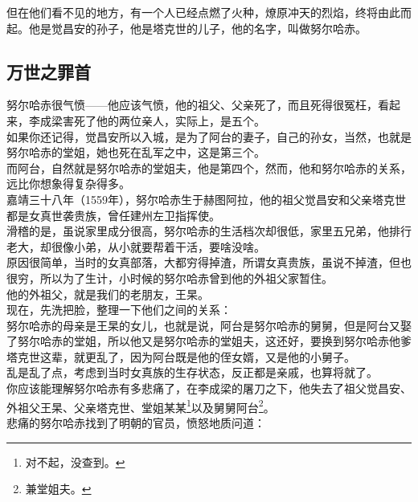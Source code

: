 \begin{multicols}{\theparacolNo}
但在他们看不见的地方，有一个人已经点燃了火种，燎原冲天的烈焰，终将由此而起。他是觉昌安的孙子，他是塔克世的儿子，他的名字，叫做努尔哈赤。\\

\subsection{万世之罪首}
努尔哈赤很气愤——他应该气愤，他的祖父、父亲死了，而且死得很冤枉，看起来，李成梁害死了他的两位亲人，实际上，是五个。\\

如果你还记得，觉昌安所以入城，是为了阿台的妻子，自己的孙女，当然，也就是努尔哈赤的堂姐，她也死在乱军之中，这是第三个。\\

而阿台，自然就是努尔哈赤的堂姐夫，他是第四个，然而，他和努尔哈赤的关系，远比你想象得复杂得多。\\

嘉靖三十八年（1559年），努尔哈赤生于赫图阿拉，他的祖父觉昌安和父亲塔克世都是女真世袭贵族，曾任建州左卫指挥使。\\

滑稽的是，虽说家里成分很高，努尔哈赤的生活档次却很低，家里五兄弟，他排行老大，却很像小弟，从小就要帮着干活，要啥没啥。\\

原因很简单，当时的女真部落，大都穷得掉渣，所谓女真贵族，虽说不掉渣，但也很穷，所以为了生计，小时候的努尔哈赤曾到他的外祖父家暂住。\\

他的外祖父，就是我们的老朋友，王杲。\\

现在，先洗把脸，整理一下他们之间的关系：\\

努尔哈赤的母亲是王杲的女儿，也就是说，阿台是努尔哈赤的舅舅，但是阿台又娶了努尔哈赤的堂姐，所以他又是努尔哈赤的堂姐夫，这还好，要换到努尔哈赤他爹塔克世这辈，就更乱了，因为阿台既是他的侄女婿，又是他的小舅子。\\

乱是乱了点，考虑到当时女真族的生存状态，反正都是亲戚，也算将就了。\\

你应该能理解努尔哈赤有多悲痛了，在李成梁的屠刀之下，他失去了祖父觉昌安、外祖父王杲、父亲塔克世、堂姐某某\footnote{对不起，没查到。}以及舅舅阿台\footnote{兼堂姐夫。}。\\

悲痛的努尔哈赤找到了明朝的官员，愤怒地质问道：\\


\end{multicols}

